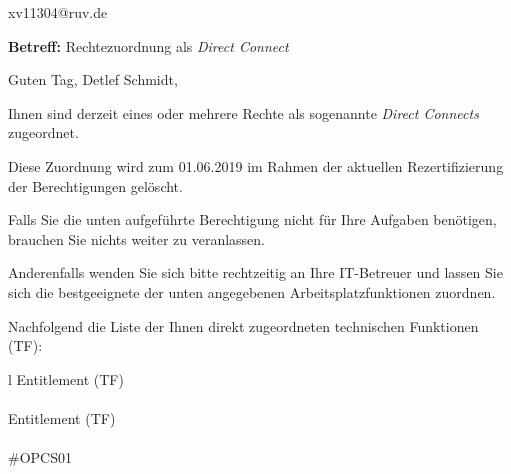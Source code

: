 \documentclass[a4paper,landscape,12pt]{letter}
\begin{document}
\begin{letter}{xv11304@ruv.de\hfill \break}
\begin{normalsize}
	\opening{\textbf{Betreff:} Rechtezuordnung als \emph{Direct Connect}}
	\begin{normalsize} \hfill
	\end{normalsize}

	\begin{normalsize}
		Guten Tag, 
	Detlef Schmidt, \hfill \break
	\end{normalsize}
	\end{normalsize}
	
\begin{normalsize}
	Ihnen sind derzeit eines oder mehrere Rechte als sogenannte \emph{Direct Connects} zugeordnet.
	
	Diese Zuordnung wird zum 01.06.2019 im Rahmen der aktuellen Rezertifizierung der Berechtigungen gelöscht.
	
	Falls Sie die unten aufgeführte Berechtigung nicht für Ihre Aufgaben benötigen, 
	brauchen Sie nichts weiter zu veranlassen.
	
	Anderenfalls wenden Sie sich bitte rechtzeitig an Ihre IT-Betreuer 
	und lassen Sie sich die bestgeeignete der unten angegebenen Arbeitsplatzfunktionen zuordnen.
	\end{normalsize}
	
\begin{normalsize}
	Nachfolgend die Liste der Ihnen direkt zugeordneten technischen Funktionen (TF):

	\begin{longtable}{l}
		Entitlement (TF) \\ \hline
		\endfirsthead
		\\\hline
		Entitlement (TF) \\ \hline
		\endhead %
		\multicolumn{1}{r@{}}{Fortsetzung \ldots}\\
		\endfoot
		\hline
		\endlastfoot
	\#OPCS01\\
	\end{longtable}
	\end{normalsize}
	

\end{letter}
\end{document}
